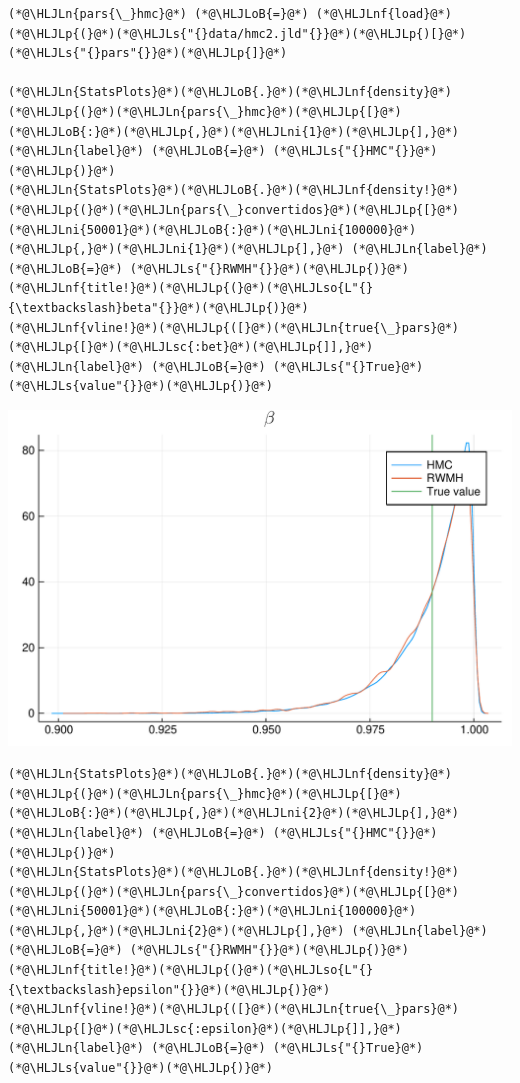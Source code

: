 \documentclass[12pt,a4paper]{article}
\newcommand{\HLJLn}[1]{#1}
\newcommand{\HLJLnf}[1]{\textcolor[RGB]{66,102,213}{#1}}
\newcommand{\HLJLs}[1]{\textcolor[RGB]{201,61,57}{#1}}
\newcommand{\HLJLsc}[1]{\textcolor[RGB]{201,61,57}{#1}}
\newcommand{\HLJLso}[1]{\textcolor[RGB]{201,61,57}{#1}}
\newcommand{\HLJLni}[1]{\textcolor[RGB]{59,151,46}{#1}}
\newcommand{\HLJLoB}[1]{\textcolor[RGB]{102,102,102}{\textbf{#1}}}
\newcommand{\HLJLp}[1]{#1}
\begin{document}
\begin{lstlisting}
(*@\HLJLn{pars{\_}hmc}@*) (*@\HLJLoB{=}@*) (*@\HLJLnf{load}@*)(*@\HLJLp{(}@*)(*@\HLJLs{"{}data/hmc2.jld"{}}@*)(*@\HLJLp{)[}@*)(*@\HLJLs{"{}pars"{}}@*)(*@\HLJLp{]}@*)

(*@\HLJLn{StatsPlots}@*)(*@\HLJLoB{.}@*)(*@\HLJLnf{density}@*)(*@\HLJLp{(}@*)(*@\HLJLn{pars{\_}hmc}@*)(*@\HLJLp{[}@*)(*@\HLJLoB{:}@*)(*@\HLJLp{,}@*)(*@\HLJLni{1}@*)(*@\HLJLp{],}@*) (*@\HLJLn{label}@*) (*@\HLJLoB{=}@*) (*@\HLJLs{"{}HMC"{}}@*)(*@\HLJLp{)}@*)
(*@\HLJLn{StatsPlots}@*)(*@\HLJLoB{.}@*)(*@\HLJLnf{density!}@*)(*@\HLJLp{(}@*)(*@\HLJLn{pars{\_}convertidos}@*)(*@\HLJLp{[}@*)(*@\HLJLni{50001}@*)(*@\HLJLoB{:}@*)(*@\HLJLni{100000}@*)(*@\HLJLp{,}@*)(*@\HLJLni{1}@*)(*@\HLJLp{],}@*) (*@\HLJLn{label}@*) (*@\HLJLoB{=}@*) (*@\HLJLs{"{}RWMH"{}}@*)(*@\HLJLp{)}@*)
(*@\HLJLnf{title!}@*)(*@\HLJLp{(}@*)(*@\HLJLso{L"{}{\textbackslash}beta"{}}@*)(*@\HLJLp{)}@*)
(*@\HLJLnf{vline!}@*)(*@\HLJLp{([}@*)(*@\HLJLn{true{\_}pars}@*)(*@\HLJLp{[}@*)(*@\HLJLsc{:bet}@*)(*@\HLJLp{]],}@*) (*@\HLJLn{label}@*) (*@\HLJLoB{=}@*) (*@\HLJLs{"{}True}@*) (*@\HLJLs{value"{}}@*)(*@\HLJLp{)}@*)
\end{lstlisting}

\includegraphics[width=\linewidth]{figures/dsge_and_julia_44_1.pdf}

\begin{lstlisting}
(*@\HLJLn{StatsPlots}@*)(*@\HLJLoB{.}@*)(*@\HLJLnf{density}@*)(*@\HLJLp{(}@*)(*@\HLJLn{pars{\_}hmc}@*)(*@\HLJLp{[}@*)(*@\HLJLoB{:}@*)(*@\HLJLp{,}@*)(*@\HLJLni{2}@*)(*@\HLJLp{],}@*) (*@\HLJLn{label}@*) (*@\HLJLoB{=}@*) (*@\HLJLs{"{}HMC"{}}@*)(*@\HLJLp{)}@*)
(*@\HLJLn{StatsPlots}@*)(*@\HLJLoB{.}@*)(*@\HLJLnf{density!}@*)(*@\HLJLp{(}@*)(*@\HLJLn{pars{\_}convertidos}@*)(*@\HLJLp{[}@*)(*@\HLJLni{50001}@*)(*@\HLJLoB{:}@*)(*@\HLJLni{100000}@*)(*@\HLJLp{,}@*)(*@\HLJLni{2}@*)(*@\HLJLp{],}@*) (*@\HLJLn{label}@*) (*@\HLJLoB{=}@*) (*@\HLJLs{"{}RWMH"{}}@*)(*@\HLJLp{)}@*)
(*@\HLJLnf{title!}@*)(*@\HLJLp{(}@*)(*@\HLJLso{L"{}{\textbackslash}epsilon"{}}@*)(*@\HLJLp{)}@*)
(*@\HLJLnf{vline!}@*)(*@\HLJLp{([}@*)(*@\HLJLn{true{\_}pars}@*)(*@\HLJLp{[}@*)(*@\HLJLsc{:epsilon}@*)(*@\HLJLp{]],}@*) (*@\HLJLn{label}@*) (*@\HLJLoB{=}@*) (*@\HLJLs{"{}True}@*) (*@\HLJLs{value"{}}@*)(*@\HLJLp{)}@*)
\end{lstlisting}
\end{document}
